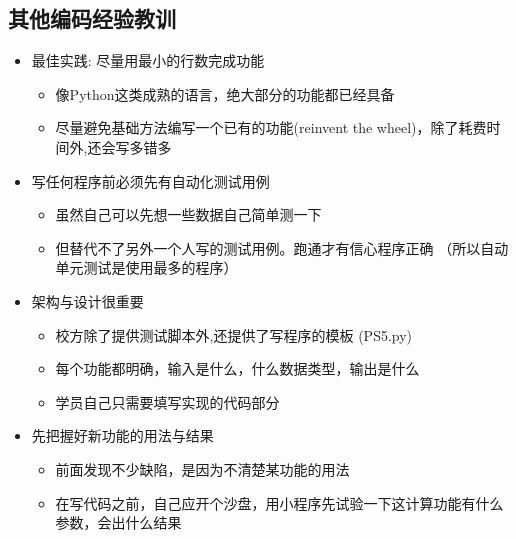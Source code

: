 \hypertarget{ux5176ux4ed6ux7f16ux7801ux7ecfux9a8cux6559ux8bad}{%
\subsection{其他编码经验教训}\label{ux5176ux4ed6ux7f16ux7801ux7ecfux9a8cux6559ux8bad}}

\begin{itemize}
\tightlist
\item
  最佳实践: 尽量用最小的行数完成功能

  \begin{itemize}
  \tightlist
  \item
    像Python这类成熟的语言，绝大部分的功能都已经具备
  \item
    尽量避免基础方法编写一个已有的功能(reinvent the
    wheel)，除了耗费时间外,还会写多错多
  \end{itemize}
\end{itemize}

\begin{itemize}
\tightlist
\item
  写任何程序前必须先有自动化测试用例

  \begin{itemize}
  \tightlist
  \item
    虽然自己可以先想一些数据自己简单测一下
  \item
    但替代不了另外一个人写的测试用例。跑通才有信心程序正确
    （所以自动单元测试是使用最多的程序）
  \end{itemize}
\end{itemize}

\begin{itemize}
\tightlist
\item
  架构与设计很重要

  \begin{itemize}
  \tightlist
  \item
    校方除了提供测试脚本外,还提供了写程序的模板 (PS5.py)
  \item
    每个功能都明确，输入是什么，什么数据类型，输出是什么
  \item
    学员自己只需要填写实现的代码部分
  \end{itemize}
\end{itemize}

\begin{itemize}
\tightlist
\item
  先把握好新功能的用法与结果

  \begin{itemize}
  \tightlist
  \item
    前面发现不少缺陷，是因为不清楚某功能的用法
  \item
    在写代码之前，自己应开个沙盘，用小程序先试验一下这计算功能有什么参数，会出什么结果
  \end{itemize}
\end{itemize}


